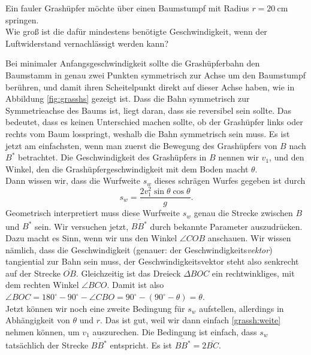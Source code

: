 \begin{Exercise}[label = grassh, title = fauler Grashüpfer, origin = P.Gnädig, difficulty = 5]
	Ein fauler Grashüpfer möchte über einen Baumstumpf mit Radius $r = 20~\mathrm{cm}$ springen.\\
	Wie groß ist die dafür mindestens benötigte Geschwindigkeit, wenn der Luftwiderstand vernachlässigt werden kann?
\end{Exercise}
\begin{Answer}[ref = grassh]
	Bei minimaler Anfangsgeschwindigkeit sollte die Grashüpferbahn den Baumstamm in genau zwei Punkten symmetrisch zur Achse um den Baumstumpf berühren, und damit ihren Scheitelpunkt direkt auf dieser Achse haben, wie in Abbildung \ref{fig:grasshs} gezeigt ist. Dass die Bahn symmetrisch zur Symmetrieachse des Baums ist, liegt daran, dass sie reversibel sein sollte. Das bedeutet, dass es keinen Unterschied machen sollte, ob der Grashüpfer links oder rechts vom Baum losspringt, weshalb die Bahn symmetrisch sein muss. 
	Es ist jetzt am einfachsten, wenn man zuerst die Bewegung des Grashüpfers von $B$ nach $B^{\ast}$ betrachtet. Die Geschwindigkeit des Grashüpfers in $B$ nennen wir $v_1$, und den Winkel, den die Grashüpfergeschwindigkeit mit dem Boden macht $\theta$.\\
	Dann wissen wir, dass die Wurfweite $s_w$ dieses schrägen Wurfes gegeben ist durch
	\begin{equation}\label{grassh:weite}
		s_w = \frac{2 v_1^2 \sin \theta \cos \theta}{g}.
	\end{equation}
	Geometrisch interpretiert muss diese Wurfweite $s_w$ genau die Strecke zwischen $B$ und $B^{\ast}$ sein. Wir versuchen jetzt, $\overline{BB^{\ast}}$ durch bekannte Parameter auszudrücken.\\
	Dazu macht es Sinn, wenn wir uns den Winkel $\angle COB$ anschauen. Wir wissen nämlich, dass die Geschwindigkeit (genauer: der Geschwindigkeits\textit{vektor}) tangiential zur Bahn sein muss, der Geschwindigkeitsvektor steht also senkrecht auf der Strecke $\overline{OB}$. Gleichzeitig ist das Dreieck $\Delta BOC$ ein rechtwinkliges, mit dem rechten Winkel $\angle BCO$. Damit ist also $\angle BOC = 180^\circ-90^\circ-\angle CBO = 90^\circ- \left(90^\circ- \theta\right) = \theta$.\\
	Jetzt können wir noch eine zweite Bedingung für $s_w$ aufstellen, allerdings in Abhängigkeit von $\theta$ und $r$. Das ist gut, weil wir dann einfach \eqref{grassh:weite} nehmen können, um $v_1$ auszurechen. Die Bedingung ist einfach, dass $s_w$ tatsächlich der Strecke $\overline{BB^\ast}$ entspricht. Es ist $\overline{BB^\ast} = 2 \overline{BC}$.\\

\end{Answer}
